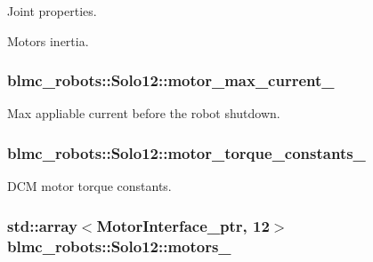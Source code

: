 Joint properties. 

Motors inertia. 
\subsubsection[{\texorpdfstring{motor\+\_\+max\+\_\+current\+\_\+}{motor_max_current_}}]{ blmc\+\_\+robots\+::\+Solo12\+::motor\+\_\+max\+\_\+current\+\_\+\hspace{0.3cm}{\ttfamily [private]}}\hypertarget{classblmc__robots_1_1Solo12_a46cab41a223dc4ee824e6d192cc01f9d}{}\label{classblmc__robots_1_1Solo12_a46cab41a223dc4ee824e6d192cc01f9d}


Max appliable current before the robot shutdown. 

\subsubsection[{\texorpdfstring{motor\+\_\+torque\+\_\+constants\+\_\+}{motor_torque_constants_}}]{ blmc\+\_\+robots\+::\+Solo12\+::motor\+\_\+torque\+\_\+constants\+\_\+\hspace{0.3cm}{\ttfamily [private]}}\hypertarget{classblmc__robots_1_1Solo12_a4bab49dbf3f7234b6e0d5166696c885a}{}\label{classblmc__robots_1_1Solo12_a4bab49dbf3f7234b6e0d5166696c885a}


D\+CM motor torque constants. 

\subsubsection[{\texorpdfstring{motors\+\_\+}{motors_}}]{\setlength{\rightskip}{0pt plus 5cm}std\+::array$<${\bf Motor\+Interface\+\_\+ptr}, 12$>$ blmc\+\_\+robots\+::\+Solo12\+::motors\+\_\+\hspace{0.3cm}{\ttfamily [private]}}\hypertarget{classblmc__robots_1_1Solo12_a91e6592fb8a24aabb9a9795cccc130cf}{}\label{classblmc__robots_1_1Solo12_a91e6592fb8a24aabb9a9795cccc130cf}


